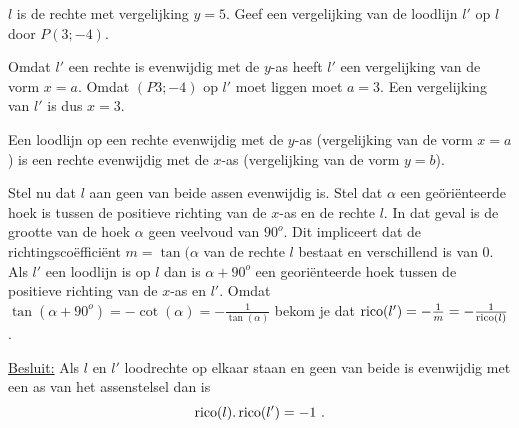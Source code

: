 \begin{voorbeeld}
	$l$ is de rechte met vergelijking $y=5$.
Geef een vergelijking van de loodlijn $l'$ op $l$ door $P(3;-4)$.


Omdat $l'$ een rechte is evenwijdig met de $y$-as heeft $l'$ een vergelijking van de vorm $x=a$.
Omdat $(P3;-4)$ op $l'$ moet liggen moet $a=3$.
Een vergelijking van $l'$ is dus $x=3$.

Een loodlijn op een rechte evenwijdig met de $y$-as (vergelijking van de vorm $x=a$) is een rechte evenwijdig met de $x$-as (vergelijking van de vorm $y=b$).

Stel nu dat $l$ aan geen van beide assen evenwijdig is.
Stel dat $\alpha$ een ge\"ori\"enteerde hoek is tussen de positieve richting van de $x$-as en de rechte $l$.
In dat geval is de grootte van de hoek $\alpha$ geen veelvoud van $90^o$.
Dit impliceert dat de richtingsco\"effici\"ent $m=\tan (\alpha$ van de rechte $l$ bestaat en verschillend is van 0.
Als $l'$ een loodlijn is op $l$ dan is $\alpha + 90^o$ een geori\"enteerde hoek tussen de positieve richting van de $x$-as en $l'$.
Omdat $\tan (\alpha + 90^o)=-\cot (\alpha)=-\frac{1}{\tan (\alpha)}$  bekom je dat $\operatorname{rico} (l')=-\frac{1}{m}=-\frac{1}{\operatorname{rico} (l)}$.

\underline {Besluit:} Als $l$ en $l'$ loodrechte op elkaar staan en geen van beide is evenwijdig met een as van het assenstelsel dan is
\[
\operatorname{rico} (l).\operatorname{rico} (l')=-1 \text { .}
\]

\end{voorbeeld}


